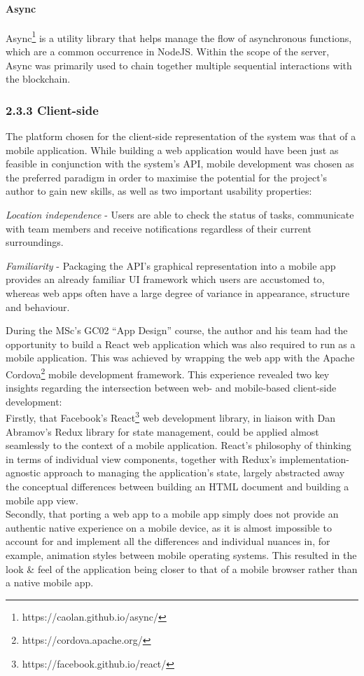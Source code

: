 \documentclass[12pt]{report}
\let\oldparagraph\paragraph
\renewcommand{\paragraph}[1]{\oldparagraph{#1}\mbox{}}
\begin{document}
\paragraph{Async}\label{async}

Async\footnote{https://caolan.github.io/async/} is a utility
library that helps manage the flow of asynchronous functions, which are
a common occurrence in NodeJS. Within the scope of the server, Async was
primarily used to chain together multiple sequential interactions with
the blockchain.

\subsubsection{2.3.3 Client-side}\label{client-side}

The platform chosen for the client-side representation of the system was
that of a mobile application. While building a web application would
have been just as feasible in conjunction with the system's API, mobile
development was chosen as the preferred paradigm in order to maximise
the potential for the project's author to gain new skills, as well as
two important usability properties:

\emph{Location independence} - Users are able to check the status of
tasks, communicate with team members and receive notifications
regardless of their current surroundings.

\emph{Familiarity} - Packaging the API's graphical representation into a
mobile app provides an already familiar UI framework which users are
accustomed to, whereas web apps often have a large degree of variance in
appearance, structure and behaviour.

During the MSc's GC02 ``App Design'' course, the author and his team had
the opportunity to build a React web application which was also required
to run as a mobile application. This was achieved by wrapping the web
app with the Apache Cordova\footnote{https://cordova.apache.org/}
mobile development framework. This experience revealed two key insights
regarding the intersection between web- and mobile-based client-side
development:\\
Firstly, that Facebook's
React\footnote{https://facebook.github.io/react/} web development
library, in liaison with Dan Abramov's
Redux\cite{1redux} library for state management,
could be applied almost seamlessly to the context of a mobile
application. React's philosophy of thinking in terms of individual view
components, together with Redux's implementation-agnostic approach to
managing the application's state, largely abstracted away the conceptual
differences between building an HTML document and building a mobile app
view.\\
Secondly, that porting a web app to a mobile app simply does not provide
an authentic native experience on a mobile device, as it is almost
impossible to account for and implement all the differences and
individual nuances in, for example, animation styles between mobile
operating systems. This resulted in the look \& feel of the application
being closer to that of a mobile browser rather than a native mobile
app.
\end{document}
